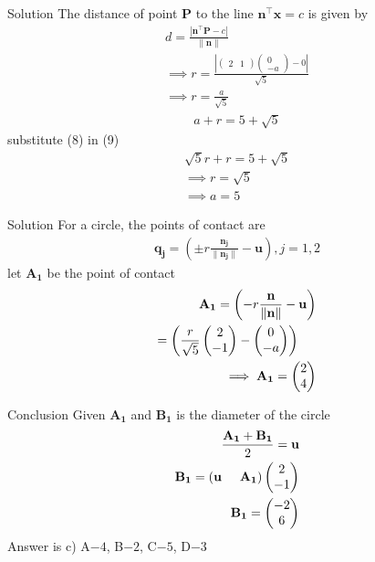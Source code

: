 \documentclass{beamer}
\numberwithin{equation}{section}
\providecommand{\brak}[1]{\ensuremath{\left(#1\right)}}
\theoremstyle{remark}
\providecommand{\norm}[1]{\lVert#1\rVert}
\newcommand{\myvec}[1]{\ensuremath{\begin{pmatrix}#1\end{pmatrix}}}
\let\vec\mathbf
\begin{document}
\begin{frame}{Solution}
The distance of point $\vec{P}$ to the line $\vec{n}^\top\vec{x}=c$ is given by
\begin{align}
    d=\frac{|\vec{n}^\top\vec{P}-c|}{\norm{\vec{n}}}\\
    \implies r = \frac{\left\lvert
\begin{pmatrix} 2 & 1 \end{pmatrix}
\begin{pmatrix} 0 \\ -a \end{pmatrix} - 0
\right\rvert}{\sqrt{5}}\\
\implies r=\frac{a}{\sqrt{5}}
\end{align}
\begin{align}
a + r = 5 + \sqrt{5}
\end{align}
substitute (8) in (9)
\begin{align}
\sqrt{5}r +r =5 +\sqrt{5}\\
    \implies r=\sqrt{5}\\
    \implies a=5
\end{align}
\end{frame}

\begin{frame}{Solution}
For a circle, the points of contact are
\begin{align}
    \vec{q_{j}}=\brak{\pm r \frac{\vec{n_j}}{\norm{\vec{n_j}}}-\vec{u}},j=1,2
\end{align}
let $\vec{A_1}$ be the point of contact
\begin{align}
    \vec{A_1}=\brak{-r \frac{\vec{n}}{\norm{\vec{n}}}-\vec{u}}\\
    =\brak{\frac{r}{\sqrt{5}}\myvec{2\\-1}-\myvec{0\\-a}} \hspace{0.5cm}\\ 
    \implies \vec{A_1}=\myvec{2\\4}
\end{align}
\end{frame}

\begin{frame}{Conclusion}
Given  $\vec{A_1}$ and $\vec{B_1}$ is the diameter of the circle 
\begin{align}
    \frac{\vec{A_1}+\vec{B_1}}{2}=\vec{u}\\
    \vec{B_1}=\brak{\vec{u} \hspace{0.5cm} \vec{A_1}}\myvec{2\\-1}\\
    \vec{B_1}=\myvec{-2\\6}
\end{align}
Answer is c) A$- 4$, B$- 2$, C$- 5$, D$- 3$
\end{frame}
\end{document}
